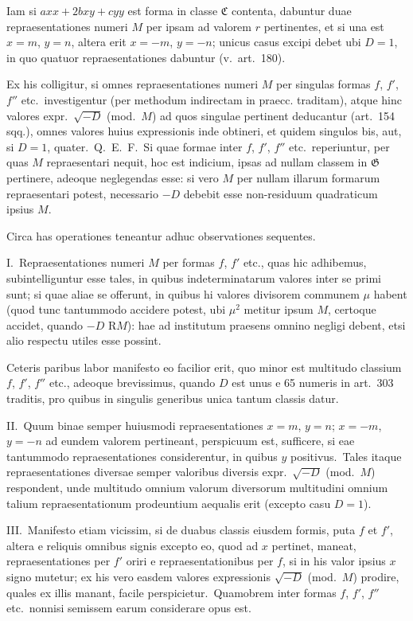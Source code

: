 \documentclass[12pt,a4paper]{article}
\theoremstyle{plain}
\theoremstyle{definition}
\theoremstyle{remark}
\begin{document}
Iam si $axx+2bxy+cyy$ est forma in classe $\mathfrak{C}$ contenta, dabuntur
duae repraesentationes numeri $M$ per ipsam ad valorem $r$ pertinentes, et si
una est $x=m$, $y=n$, altera erit $x=-m$, $y=-n$; unicus casus
excipi debet ubi $D=1$, in quo quatuor repraesentationes dabuntur (v.\ art.\ 180).

Ex his colligitur, si omnes repraesentationes numeri $M$ per singulas
formas $f$, $f'$, $f''$ etc.\ investigentur (per methodum indirectam in praecc.
traditam), atque hinc valores expr.\ $\sqrt{-D}$ (mod.\ $M$) ad quos singulae
pertinent deducantur (art.\ 154 sqq.), omnes valores huius expressionis inde
obtineri, et quidem singulos bis, aut, si $D=1$, quater.\ Q.\ E.\ F.\ Si
quae formae inter $f$, $f'$, $f''$ etc.\ reperiuntur, per quas $M$ repraesentari
nequit, hoc est indicium, ipsas ad nullam classem in $\mathfrak{G}$ pertinere, adeoque
neglegendas esse: si vero $M$ per nullam illarum formarum repraesentari
potest, necessario $-D$ debebit esse non-residuum quadraticum ipsius $M$.

Circa has operationes teneantur adhuc observationes sequentes.

I.\ Repraesentationes numeri $M$ per formas $f$, $f'$ etc., quas hic
adhibemus, subintelliguntur esse tales, in quibus indeterminatarum valores
inter se primi sunt; si quae aliae se offerunt, in quibus hi valores divisorem
communem $\mu$ habent (quod tunc tantummodo accidere potest, ubi $\mu^2$ metitur
ipsum $M$, certoque accidet, quando $-D$ R$M$): hae ad institutum praesens
omnino negligi debent, etsi alio respectu utiles esse possint.

Ceteris paribus labor manifesto eo facilior erit, quo minor est multitudo
classium $f$, $f'$, $f''$ etc., adeoque brevissimus, quando $D$ est unus e 65
numeris in art.\ 303 traditis, pro quibus in singulis generibus unica tantum
classis datur.

II.\ Quum binae semper huiusmodi repraesentationes $x=m$, $y=n$;
$x=-m$, $y=-n$ ad eundem valorem pertineant, perspicuum est,
sufficere, si eae tantummodo repraesentationes considerentur, in quibus $y$
positivus.\ Tales itaque repraesentationes diversae semper valoribus diversis
expr.\ $\sqrt{-D}$ (mod.\ $M$) respondent, unde multitudo omnium valorum
diversorum multitudini omnium talium repraesentationum prodeuntium
aequalis erit (excepto casu $D=1$).

III.\ Manifesto etiam vicissim, si de duabus classis eiusdem formis,
puta $f$ et $f'$, altera e reliquis omnibus signis excepto eo, quod ad $x$
pertinet, maneat, repraesentationes per $f'$ oriri e repraesentationibus per $f$,
si in his valor ipsius $x$ signo mutetur; ex his vero easdem valores
expressionis $\sqrt{-D}$ (mod.\ $M$) prodire, quales ex illis manant, facile
perspicietur.\ Quamobrem inter formas $f$, $f'$, $f''$ etc.\ nonnisi semissem
earum considerare opus est.
\end{document}
